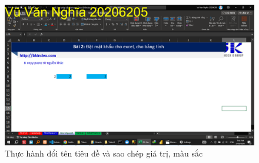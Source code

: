 \documentclass{article}
\begin{document}
 


\begin{figure}[h]
    \centering
    \includegraphics[scale = 0.15]{Video4/ThucHanh/1.png}
    \caption{Thực hành đổi tên tiêu đề và sao chép giá trị, màu sắc}
\end{figure}








\end{document}
